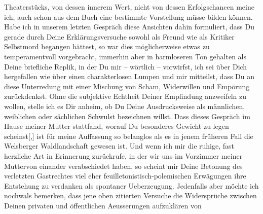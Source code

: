 \begin{ledgroupsized}[t]{13cm}
               Theaterstücks, von dessen innerem Wert, nicht von dessen Erfolgschancen meine ich,
               auch schon aus dem Buch eine bestimmte Vorstellung müsse bilden können. Habe ich in
               unserem letzten Gespräch diese Ansichten dahin formuliert, dass Du gerade durch Deine
               Erklärungsversuche sowohl als Freund wie als Kritiker Selbstmord begangen hättest, so
               war dies möglicherweise  etwas zu temperamentvoll
               vorgebracht, immerhin aber in harmloseren Ton gehalten als Deine briefliche Replik,
               in der Du mir – wörtlich – vorwirfst, ich sei über Dich hergefallen wie über einen
               charakterlosen Lumpen und mir mitteilst, dass Du an diese Unterredung mit einer
               Mischung von Scham, Widerwillen und Empörung zurückdenkst. Ohne die subjektive
               Echtheit Deiner Empfindung anzweifeln zu wollen, stelle ich es Dir anheim, ob Du
               Deine Ausdrucksweise als männlichen, weiblichen oder sächlichen Schwulst bezeichnen
               willst. {\pb}Dass dieses Gespräch im Hause
               meiner Mutter stattfand,
               worauf Du besonderes Gewicht zu legen scheinst{[},{]} ist für meine
               Auffassung so belanglos als es in jenem früheren Fall die Welsberger Waldlandschaft gewesen ist. Und wenn ich mir die
               ruhige, fast herzliche Art in Erinnerung zurückrufe, in der wir uns im Vorzimmer
               meiner Mutter\introOben{}von einander\introOben{} verabschiedet haben, so scheint mir Deine
               Betonung des verletzten Gastrechtes viel eher feuilletoni\introOben{}sti\introOben{}sch-polemischen Erwägungen ihre Entstehung zu verdanken als spontaner
               Ueberzeugung. Jedenfalls aber möchte ich nochwals bemerken, dass jene oben zitierten
               Versuche die Widersprüche zwischen Deinen privaten und öffentlichen Aeusserungen aufzuklären von

\end{ledgroupsized}
